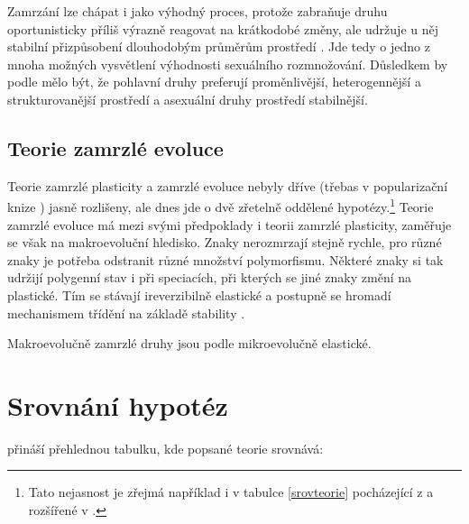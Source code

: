 Zamrzání lze chápat i jako výhodný proces, protože zabraňuje druhu oportunisticky příliš výrazně reagovat na
krátkodobé změny, ale udržuje u něj stabilní přizpůsobení dlouhodobým průměrům prostředí \citep[str. 195]{flegr2016}.
Jde tedy o jedno z mnoha možných vysvětlení výhodnosti sexuálního rozmnožování. Důsledkem by podle
\citet[str. 166--167]{toman2015} mělo být, že pohlavní druhy preferují proměnlivější, heterogennější
a strukturovanější prostředí a asexuální druhy prostředí stabilnější.

\subsection{Teorie zamrzlé evoluce}

Teorie zamrzlé plasticity a zamrzlé evoluce nebyly dříve (třebas v popularizační knize \citet{flegr2006})
jasně rozlišeny, ale dnes   jde o dvě zřetelně oddělené hypotézy.\footnote{
Tato nejasnost je zřejmá například i v tabulce \ref{srovteorie} pocházející z \citet{flegr2010} a rozšířené v
\citet{flegr2013}.
}
Teorie zamrzlé evoluce má mezi svými předpoklady i teorii zamrzlé plasticity, zaměřuje se však na makroevoluční
hledisko. Znaky nerozmrzají stejně rychle, pro různé znaky je potřeba odstranit různé množství polymorfismu.
Některé znaky si tak udržijí polygenní stav i při speciacích, při kterých se jiné znaky změní na plastické.
Tím se stávají ireverzibilně elastické a postupně se hromadí mechanismem třídění
na základě stability \citep[str. 294--296]{flegr2016}.

Makroevolučně zamrzlé druhy jsou podle \citet[str. 2]{flegr2013} mikroevolučně elastické.

\section{Srovnání hypotéz}

\citet{flegr2013} přináší přehlednou tabulku, kde popsané teorie srovnává:

\footnotesize

